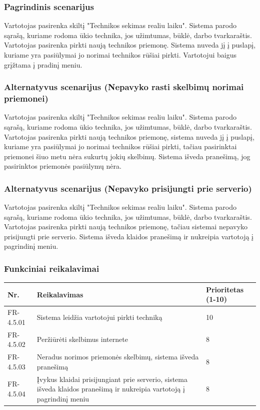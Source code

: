 \documentclass[oneside]{VUMIFPSkursinis}
\begin{document}
\subsubsection{Pagrindinis scenarijus}
	Vartotojas pasirenka skiltį "Technikos sekimas realiu laiku". Sistema parodo sąrašą, kuriame rodoma ūkio technika, jos užimtumas, būklė, darbo tvarkaraštis. Vartotojas pasirenka pirkti naują technikos priemonę. Sistema nuveda jį į puslapį, kuriame yra pasiūlymai jo norimai technikos rūšiai pirkti. Vartotojui baigus grįžtama į pradinį meniu.
\subsubsection{Alternatyvus scenarijus (Nepavyko rasti skelbimų norimai priemonei)}
	Vartotojas pasirenka skiltį "Technikos sekimas realiu laiku". Sistema parodo sąrašą, kuriame rodoma ūkio technika, jos užimtumas, būklė, darbo tvarkaraštis. Vartotojas pasirenka pirkti naują technikos priemonę, sistema nuveda jį į puslapį, kuriame yra pasiūlymai jo norimai technikos rūšiai pirkti, tačiau pasirinktai priemonei šiuo metu nėra sukurtų jokių skelbimų. Sistema išveda pranešimą, jog pasirinktos priemonės pasiūlymų nėra.
\pagebreak
\subsubsection{Alternatyvus scenarijus (Nepavyko prisijungti prie serverio)}
	Vartotojas pasirenka skiltį "Technikos sekimas realiu laiku". Sistema parodo sąrašą, kuriame rodoma ūkio technika, jos užimtumas, būklė, darbo tvarkaraštis. Vartotojas pasirenka pirkti naują technikos priemonę, tačiau sistemai nepavyko prisijungti prie serverio. Sistema išveda klaidos pranešimą ir nukreipia vartotoją į pagrindinį meniu.
\subsubsection{Funkciniai reikalavimai}
\begin{table}[htbp]
	\begin{tabularx}{1\textwidth}{ |P{2.5cm}|X|P{3cm }| }  \hline
           	Nr. & Reikalavimas &  Prioritetas (1-10)  \\   \hline 
         	FR-4.5.01 & Sistema leidžia vartotojui pirkti techniką & 10  \\   \hline
		FR-4.5.02 & Peržiūrėti skelbimus internete & 8 \\ \hline
        	FR-4.5.03 & Neradus norimos priemonės skelbimų, sistema išveda pranešimą & 8   \\   \hline
		FR-4.5.04 & Įvykus klaidai prisijungiant prie serverio, sistema išveda klaidos pranešimą ir nukreipia vartotoją į pagrindinį meniu & 8 \\ \hline
	\end{tabularx}
\end{table}
\end{document}
